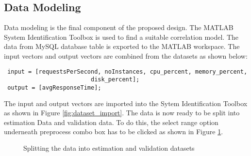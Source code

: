 \documentclass[article,type=msc,colorback,12pt,accentcolor=tud8b,table]{tudthesis}
\begin{document}
	\subsection{Data Modeling}
 
 Data modeling is the final component of the proposed design. The MATLAB System Identification Toolbox is used to find a suitable correlation model. The data from MySQL database table is exported to the MATLAB workspace. The input vectors and output vectors are combined from the datasets as shown below:
 \begin{lstlisting} 
 input = [requestsPerSecond, noInstances, cpu_percent, memory_percent, 
						 disk_percent];
 output = [avgResponseTime];
 \end{lstlisting}
  The input and output vectors are imported into the Sytem Identification Toolbox as shown in Figure \ref{fig:dataset_import}. The data is now ready to be split into estimation Data and validation data. To do this, the select range option underneath preprocess combo box has to be clicked as shown in Figure \ref{fig:split_dataset}. 
  
      \begin{figure}[h]
      	\begin{center}
      		\makebox[\textwidth]{\texttt{[image: D7]}}
      	\end{center}
      	\caption{Splitting the data into estimation and validation datasets}
      	\label{fig:split_dataset}
      \end{figure}
  
\end{document}
